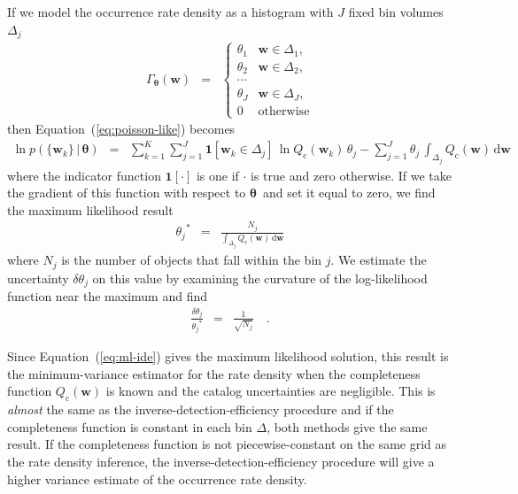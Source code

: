 \documentclass[12pt,preprint]{aastex}
\newcommand{\Eq}[1]{Equation~(\ref{eq:#1})}
\newcommand{\eq}[1]{\Eq{#1}}
\newcommand{\eqlabel}[1]{\label{eq:#1}}
\newcommand{\dd}{\ensuremath{\,\mathrm{d}}}
\newcommand{\bvec}[1]{\ensuremath{\boldsymbol{#1}}}
\newcommand{\rate}{\ensuremath{\Gamma}}
\newcommand{\ratepar}{{\ensuremath{\theta}}}
\newcommand{\ratepars}{{\ensuremath{\bvec{\ratepar}}}}
\newcommand{\completeness}{{\ensuremath{Q_\mathrm{c}}}}
\newcommand{\entry}{{\ensuremath{\bvec{w}}}}
\newcommand{\binarea}{{\ensuremath{\Delta}}}
\begin{document}
If we model the occurrence rate density as a histogram with $J$ fixed bin
volumes $\binarea_j$
\begin{eqnarray}
\rate_\ratepars (\entry) &=& \left\{\begin{array}{ll}
\ratepar_1 & \entry \in \binarea_1,\\
\ratepar_2 & \entry \in \binarea_2,\\
\cdots \\
\ratepar_J & \entry \in \binarea_J,\\
0 & \mathrm{otherwise}
\end{array}\right.
\end{eqnarray}
then \eq{poisson-like} becomes
\begin{eqnarray}
\ln p(\{\entry_k\}\,|\,\ratepars) &=&
    \sum_{k=1}^K \sum_{j=1}^J \mathbf{1}[\entry_k \in
        \binarea_j]\,\ln\completeness(\entry_k)\,\ratepar_j
    -\sum_{j=1}^J\ratepar_j\,\int_{\binarea_j} \completeness(\entry)\dd\entry
\end{eqnarray}
where the indicator function $\mathbf{1}[\cdot]$ is one if $\cdot$ is true and
zero otherwise.
If we take the gradient of this function with respect to \ratepars\ and set it
equal to zero, we find the maximum likelihood result
\begin{eqnarray}\eqlabel{ml-ide}
{\ratepar_j}^* &=&
\frac{N_j}{\int_{\binarea_j} \completeness(\entry)\dd\entry}
\end{eqnarray}
where $N_j$ is the number of objects that fall within the bin $j$.
We estimate the uncertainty $\delta\ratepar_j$ on this value by examining the
curvature of the log-likelihood function near the maximum and find
\begin{eqnarray}
\frac{\delta\ratepar_j}{{\ratepar_j}^*} &=& \frac{1}{\sqrt{N_j}} \quad.
\end{eqnarray}

Since \eq{ml-ide} gives the maximum likelihood solution, this result is the
minimum-variance estimator for the rate density when the completeness function
$\completeness(\entry)$ is known and the catalog uncertainties are negligible.
This is \emph{almost} the same as the inverse-detection-efficiency procedure
and if the completeness function is constant in each bin \binarea, both
methods give the same result.
If the completeness function is not piecewise-constant on the same grid as the
rate density inference, the inverse-detection-efficiency procedure will
give a higher variance estimate of the occurrence rate density.
\end{document}
